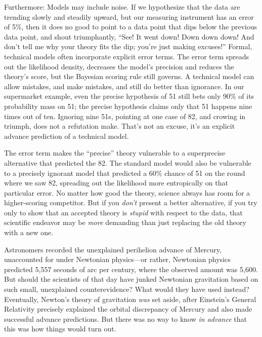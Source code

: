 {
 Furthermore: Models may include noise. If we hypothesize that the
data are trending slowly and steadily upward, but our measuring
instrument has an error of 5\%, then it does no good to point to a data
point that dips below the previous data point, and shout triumphantly,
``See! It went down! Down down down! And
don't tell me why your theory fits the dip;
you're just making excuses!'' Formal,
technical models often incorporate explicit error terms. The error term
spreads out the likelihood density, decreases the
model's precision and reduces the
theory's score, but the Bayesian scoring rule still
governs. A technical model can allow mistakes, and make mistakes, and
still do better than ignorance. In our supermarket example, even the
precise hypothesis of 51 still bets only 90\% of its probability mass
on 51; the precise hypothesis claims only that 51 happens nine times
out of ten. Ignoring nine 51s, pointing at one case of 82, and crowing
in triumph, does not a refutation make. That's not an
excuse, it's an explicit advance prediction of a
technical model.}

{
 The error term makes the
``precise'' theory vulnerable to a
superprecise alternative that predicted the 82. The standard model
would also be vulnerable to a precisely ignorant model that predicted a
60\% chance of 51 on the round where we saw 82, spreading out the
likelihood more entropically on that particular error. No matter how
good the theory, science always has room for a higher-scoring
competitor. But if you \textit{don't} present a better
alternative, if you try only to show that an accepted theory is
\textit{stupid} with respect to the data, that scientific endeavor may
be \textit{more} demanding than just replacing the old theory with a
new one.}

{
 Astronomers recorded the unexplained perihelion advance of
Mercury, unaccounted for under Newtonian physics---or rather, Newtonian
physics predicted 5,557 seconds of arc per century, where the observed
amount was 5,600. But should the scientists of that
day have junked Newtonian gravitation based on such small, unexplained
counterevidence? What would they have used instead? Eventually,
Newton's theory of gravitation \textit{was} set aside,
after Einstein's General Relativity precisely explained
the orbital discrepancy of Mercury and also made successful advance
predictions. But there was no way to know \textit{in advance} that this
was how things would turn out.}

